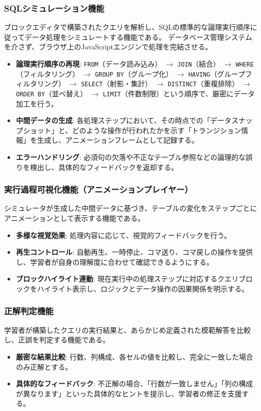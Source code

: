 \documentclass[uplatex,a4paper,12pt]{ujreport}
\begin{document}
\subsubsection{SQLシミュレーション機能}
ブロックエディタで構築されたクエリを解析し、SQLの標準的な論理実行順序に従ってデータ処理をシミュレートする機能である。
データベース管理システムを介さず、ブラウザ上のJavaScriptエンジンで処理を完結させる。
\begin{itemize}
  \item \textbf{論理実行順序の再現}: \texttt{FROM}（データ読み込み） $\rightarrow$ \texttt{JOIN}（結合） $\rightarrow$ \texttt{WHERE}（フィルタリング） $\rightarrow$ \texttt{GROUP BY}（グループ化） $\rightarrow$ \texttt{HAVING}（グループフィルタリング） $\rightarrow$ \texttt{SELECT}（射影・集計） $\rightarrow$ \texttt{DISTINCT}（重複排除） $\rightarrow$ \texttt{ORDER BY}（並べ替え） $\rightarrow$ \texttt{LIMIT}（件数制限）という順序で、厳密にデータ加工を行う。
  \item \textbf{中間データの生成}: 各処理ステップにおいて、その時点での「データスナップショット」と、どのような操作が行われたかを示す「トランジション情報」を生成し、アニメーションフレームとして記録する。
  \item \textbf{エラーハンドリング}: 必須句の欠落や不正なテーブル参照などの論理的な誤りを検出し、具体的なフィードバックを返却する。
\end{itemize}
\subsubsection{実行過程可視化機能（アニメーションプレイヤー）}
シミュレータが生成した中間データに基づき、テーブルの変化をステップごとにアニメーションとして表示する機能である。
\begin{itemize}
  \item \textbf{多様な視覚効果}: 処理内容に応じて、視覚的フィードバックを行う。%
  \item \textbf{再生コントロール}: 自動再生、一時停止、コマ送り、コマ戻しの操作を提供し、学習者が自身の理解度に合わせて確認できるようにする。
  \item \textbf{ブロックハイライト連動}: 現在実行中の処理ステップに対応するクエリブロックをハイライト表示し、ロジックとデータ操作の因果関係を明示する。
\end{itemize}
\subsubsection{正解判定機能}
学習者が構築したクエリの実行結果と、あらかじめ定義された模範解答を比較し、正誤を判定する機能である。
\begin{itemize}
  \item \textbf{厳密な結果比較}: 行数、列構成、各セルの値を比較し、完全に一致した場合のみ正解とする。
  \item \textbf{具体的なフィードバック}: 不正解の場合、「行数が一致しません」「列の構成が異なります」といった具体的なヒントを提示し、学習者の修正を支援する。
\end{itemize}
\end{document}
